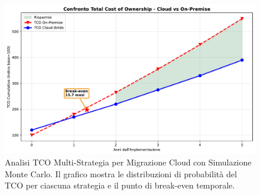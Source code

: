 \begin{figure}[htbp]
\centering
\includegraphics[width=\textwidth]{thesis_figures/cap3/fig_3_4_tco_comparison.pdf}
\caption{Analisi TCO Multi-Strategia per Migrazione Cloud con Simulazione Monte Carlo. Il grafico mostra le distribuzioni di probabilità del TCO per ciascuna strategia e il punto di break-even temporale.}
\label{fig:cloud_tco}
\end{figure}

